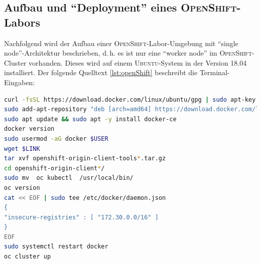 \subsection{Aufbau und \enquote{Deployment} eines \textsc{OpenShift}-Labors}
Nachfolgend wird der Aufbau einer \textsc{OpenShift}-Labor-Umgebung mit \enquote{single node}-Architektur beschrieben, d.\,h. es ist nur eine \enquote{worker node} im \textsc{OpenShift}-Cluster vorhanden. Dieses wird auf einem \textsc{Ubuntu}-System in der Version 18.04 installiert. Der folgende Quelltext \vref{lst:openShift} beschreibt die Terminal-Eingaben:

\begin{lstlisting}[language=bash, caption={Installation des \textsc{OpenShift}-Clusters}, label=lst:openShift]
curl -fsSL https://download.docker.com/linux/ubuntu/gpg | sudo apt-key add -
sudo add-apt-repository "deb [arch=amd64] https://download.docker.com/linux/ubuntu $(lsb_release -cs) stable"
sudo apt update && sudo apt -y install docker-ce
docker version
sudo usermod -aG docker $USER
wget $LINK
tar xvf openshift-origin-client-tools*.tar.gz
cd openshift-origin-client*/
sudo mv  oc kubectl  /usr/local/bin/
oc version 
cat << EOF | sudo tee /etc/docker/daemon.json 
{
"insecure-registries" : [ "172.30.0.0/16" ]
}
EOF
sudo systemctl restart docker
oc cluster up
\end{lstlisting}

